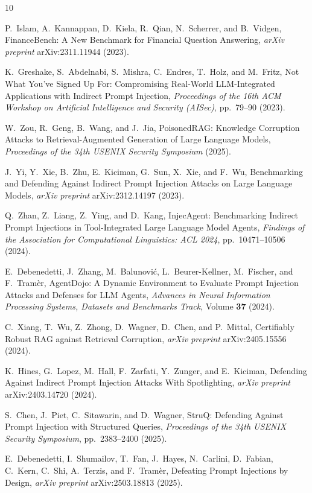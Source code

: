 \documentclass[10pt,letterpaper]{article}
\begin{document}
\begin{thebibliography}{10}
\setlength{\itemsep}{2pt}
\small

P.~Islam, A.~Kannappan, D.~Kiela, R.~Qian, N.~Scherrer, and B.~Vidgen, FinanceBench: A New Benchmark for Financial
Question Answering, \emph{arXiv preprint} arXiv:2311.11944 (2023).

K.~Greshake, S.~Abdelnabi, S.~Mishra, C.~Endres, T.~Holz, and M.~Fritz, Not What You've Signed Up For: Compromising
Real-World LLM-Integrated Applications with Indirect Prompt Injection, \emph{Proceedings of the 16th ACM Workshop on
Artificial Intelligence and Security (AISec)}, pp.~79--90 (2023).

W.~Zou, R.~Geng, B.~Wang, and J.~Jia, PoisonedRAG: Knowledge Corruption Attacks to Retrieval-Augmented Generation of
Large Language Models, \emph{Proceedings of the 34th USENIX Security Symposium} (2025).

J.~Yi, Y.~Xie, B.~Zhu, E.~Kiciman, G.~Sun, X.~Xie, and F.~Wu, Benchmarking and Defending Against Indirect Prompt
Injection Attacks on Large Language Models, \emph{arXiv preprint} arXiv:2312.14197 (2023).

Q.~Zhan, Z.~Liang, Z.~Ying, and D.~Kang, InjecAgent: Benchmarking Indirect Prompt Injections in Tool-Integrated Large
Language Model Agents, \emph{Findings of the Association for Computational Linguistics: ACL 2024},
pp.~10471--10506 (2024).

E.~Debenedetti, J.~Zhang, M.~Balunović, L.~Beurer-Kellner, M.~Fischer, and F.~Tramèr, AgentDojo: A Dynamic
Environment to Evaluate Prompt Injection Attacks and Defenses for LLM Agents, \emph{Advances in Neural Information
Processing Systems, Datasets and Benchmarks Track}, Volume \textbf{37} (2024).

C.~Xiang, T.~Wu, Z.~Zhong, D.~Wagner, D.~Chen, and P.~Mittal, Certifiably Robust RAG against Retrieval Corruption,
\emph{arXiv preprint} arXiv:2405.15556 (2024).

K.~Hines, G.~Lopez, M.~Hall, F.~Zarfati, Y.~Zunger, and E.~Kiciman, Defending Against Indirect Prompt Injection
Attacks With Spotlighting, \emph{arXiv preprint} arXiv:2403.14720 (2024).

S.~Chen, J.~Piet, C.~Sitawarin, and D.~Wagner, StruQ: Defending Against Prompt Injection with Structured Queries,
\emph{Proceedings of the 34th USENIX Security Symposium}, pp.~2383--2400 (2025).

E.~Debenedetti, I.~Shumailov, T.~Fan, J.~Hayes, N.~Carlini, D.~Fabian, C.~Kern, C.~Shi, A.~Terzis, and F.~Tramèr,
Defeating Prompt Injections by Design, \emph{arXiv preprint} arXiv:2503.18813 (2025).

\end{thebibliography}
\end{document}
